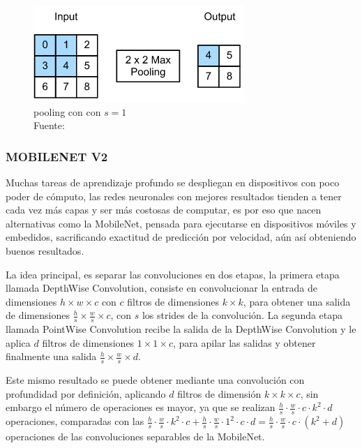        \begin{figure}[H]
            \centering
            \includegraphics[scale=0.6]{imagenes/pooling}
            \caption[Pooling con con $s=1$]{pooling con con $s=1$\\ Fuente: \citep{zhang2020dive}}
        \end{figure}
        
        \subsubsection{MOBILENET V2}
        	Muchas tareas de aprendizaje profundo se despliegan en dispositivos con poco poder de cómputo, las redes neuronales con mejores resultados tienden a tener cada vez más capas y ser más costosas de computar, es por eso que nacen alternativas como la MobileNet, pensada para ejecutarse en dispositivos móviles y embedidos, sacrificando exactitud de predicción por velocidad, aún así obteniendo buenos resultados.
        	
        	La idea principal, es separar las convoluciones en dos etapas, la primera etapa llamada DepthWise Convolution, consiste en convolucionar la entrada de dimensiones $h\times w\times c$ con $c$ filtros de dimensiones $k\times k$, para obtener una salida de dimensiones $\frac{h}{s}\times\frac{w}{s}\times c$, con $s$ los strides de la convolución. La segunda etapa llamada PointWise Convolution recibe la salida de la DepthWise Convolution y le aplica $d$ filtros de dimensiones $1\times 1\times c$, para apilar las salidas y obtener finalmente una salida $\frac{h}{s}\times\frac{w}{s}\times d$.
        	
        	Este mismo resultado se puede obtener mediante una convolución con profundidad por definición, aplicando $d$ filtros de dimensión $k\times k\times c$, sin embargo el número de operaciones es mayor, ya que se realizan $\frac{h}{s}\cdot \frac{w}{s}\cdot c\cdot k^2\cdot d$ operaciones, comparadas con las $\frac{h}{s}\cdot \frac{w}{s}\cdot k^2\cdot c + \frac{h}{s}\cdot \frac{w}{s}\cdot 1^2\cdot c\cdot d = \frac{h}{s}\cdot \frac{w}{s}\cdot c\cdot(k^2 + d)$ operaciones de las convoluciones separables de la MobileNet.
        	
